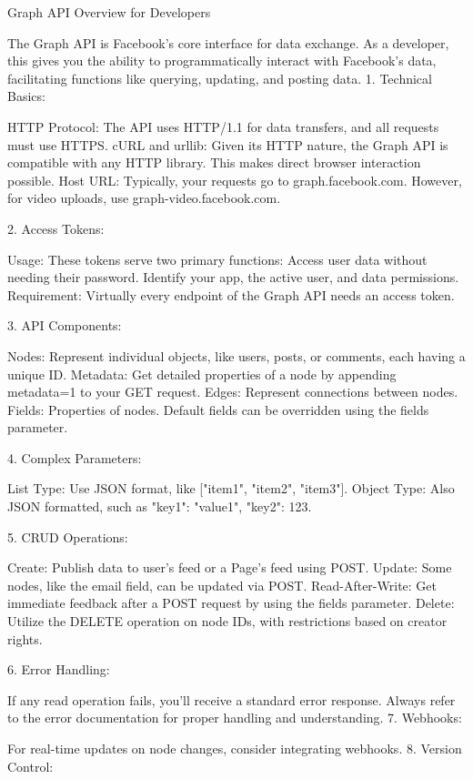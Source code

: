 Graph API Overview for Developers

The Graph API is Facebook's core interface for data exchange. As a developer, this gives you the ability to programmatically interact with Facebook's data, facilitating functions like querying, updating, and posting data.
1. Technical Basics:

    HTTP Protocol: The API uses HTTP/1.1 for data transfers, and all requests must use HTTPS.
    cURL and urllib: Given its HTTP nature, the Graph API is compatible with any HTTP library. This makes direct browser interaction possible.
    Host URL: Typically, your requests go to graph.facebook.com. However, for video uploads, use graph-video.facebook.com.

2. Access Tokens:

    Usage: These tokens serve two primary functions:
        Access user data without needing their password.
        Identify your app, the active user, and data permissions.
    Requirement: Virtually every endpoint of the Graph API needs an access token.

3. API Components:

    Nodes: Represent individual objects, like users, posts, or comments, each having a unique ID.
        Metadata: Get detailed properties of a node by appending metadata=1 to your GET request.
    Edges: Represent connections between nodes.
    Fields: Properties of nodes. Default fields can be overridden using the fields parameter.

4. Complex Parameters:

    List Type: Use JSON format, like ["item1", "item2", "item3"].
    Object Type: Also JSON formatted, such as {"key1": "value1", "key2": 123}.

5. CRUD Operations:

    Create: Publish data to user's feed or a Page's feed using POST.
    Update: Some nodes, like the email field, can be updated via POST.
    Read-After-Write: Get immediate feedback after a POST request by using the fields parameter.
    Delete: Utilize the DELETE operation on node IDs, with restrictions based on creator rights.

6. Error Handling:

If any read operation fails, you'll receive a standard error response. Always refer to the error documentation for proper handling and understanding.
7. Webhooks:

For real-time updates on node changes, consider integrating webhooks.
8. Version Control:

